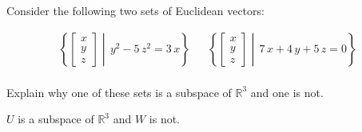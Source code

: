 
\begin{exerciseStatement}


Consider the following two sets of Euclidean vectors: 


\begin{align*}  \left\{ \left[\begin{array}{c}
x \\
y \\
z
\end{array}\right] \middle|\,y^{2} - 5 \, z^{2} = 3 \, x\right\}  & &   \left\{ \left[\begin{array}{c}
x \\
y \\
z
\end{array}\right] \middle|\,7 \, x + 4 \, y + 5 \, z = 0\right\}  \\ \end{align*}
            

 Explain why one of these sets is a subspace of \(\mathbb{R}^ 3 \) and one is not. 


\end{exerciseStatement}
    
\begin{exerciseAnswer} 


\(U\) is a subspace of \(\mathbb{R}^ 3 \) and \(W\) is not.


\end{exerciseAnswer}
    
